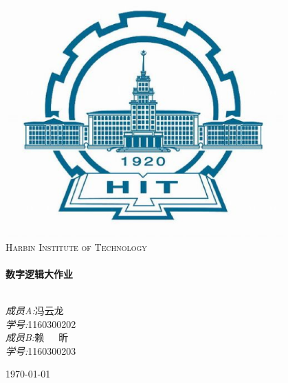 \documentclass[a4paper,11pt]{ctexart}
\begin{document}
\begin{titlepage}
\begin{center}

\includegraphics[width=0.8\textwidth]{./images/HIT.eps}\\[1cm]
\textsc{\LARGE Harbin Institute of Technology}\\[1.5cm]

\hrulefill \\[0.4cm]
{ \huge \bfseries 数字逻辑大作业}\\[0.4cm]
\hrulefill \\[1.5cm]

\begin{minipage}{0.4\textwidth}
\begin{flushleft} \large

\end{flushleft}
\end{minipage}

\begin{minipage}{\textwidth}
\begin{flushright} \large
\emph{成员A:}冯云龙\\
\emph{学号:}1160300202\\
\emph{成员B:}赖\ \ \ 昕\\
\emph{学号:}1160300203\\
\end{flushright}
\end{minipage}

\vfill
{\large \today}%
\end{center}
\end{titlepage}
\end{document}

